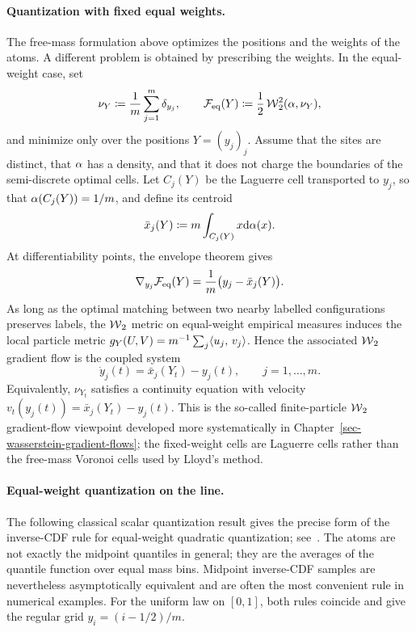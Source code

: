 \paragraph{Quantization with fixed equal weights.}
The free-mass formulation above optimizes the positions and the weights of the atoms. A different problem is obtained by prescribing the weights. In the equal-weight case, set
\[
	\nu_Y\coloneqq \frac1m\sum_{j=1}^m\delta_{y_j},
	\qquad
	\mathcal{F}_{\rm eq}(Y)
	\coloneqq
	\frac12\operatorname{\mathcal{W}}_2^2(\alpha,\nu_Y),
	\]
and minimize only over the positions \(Y=(y_j)_j\). Assume that the sites are distinct, that \(\alpha\) has a density, and that it does not charge the boundaries of the semi-discrete optimal cells. Let \(C_j(Y)\) be the Laguerre cell transported to \(y_j\), so that \(\alpha(C_j(Y))=1/m\), and define its centroid
\[
	\bar x_j(Y)
	\coloneqq
	m\int_{C_j(Y)} x\mathrm{d}\alpha(x).
\]
At differentiability points, the envelope theorem gives
\[
	\nabla_{y_j}\mathcal{F}_{\rm eq}(Y)
	=
	\frac1m\bigl(y_j-\bar x_j(Y)\bigr).
\]
As long as the optimal matching between two nearby labelled configurations preserves labels, the \(\operatorname{\mathcal{W}}_2\) metric on equal-weight empirical measures induces the local particle metric \(g_Y(U,V)=m^{-1}\sum_j\langle u_j,\,v_j\rangle\). Hence the associated \(\operatorname{\mathcal{W}}_2\) gradient flow is the coupled system
\[
	\dot y_j(t)
	=
	\bar x_j(Y_t)-y_j(t),
	\qquad j=1,\ldots,m.
\]
Equivalently, \(\nu_{Y_t}\) satisfies a continuity equation with velocity \(v_t(y_j(t))=\bar x_j(Y_t)-y_j(t)\). This is the so-called finite-particle \(\operatorname{\mathcal{W}}_2\) gradient-flow viewpoint developed more systematically in Chapter~\ref{sec-wasserstein-gradient-flows}; the fixed-weight cells are Laguerre cells rather than the free-mass Voronoi cells used by Lloyd's method.

\paragraph{Equal-weight quantization on the line.}
The following classical scalar quantization result gives the precise form of the inverse-CDF rule for equal-weight quadratic quantization; see~\cite{graf2000foundationsquantization}. The atoms are not exactly the midpoint quantiles in general; they are the averages of the quantile function over equal mass bins. Midpoint inverse-CDF samples are nevertheless asymptotically equivalent and are often the most convenient rule in numerical examples. For the uniform law on $[0,1]$, both rules coincide and give the regular grid $y_i=(i-1/2)/m$.

